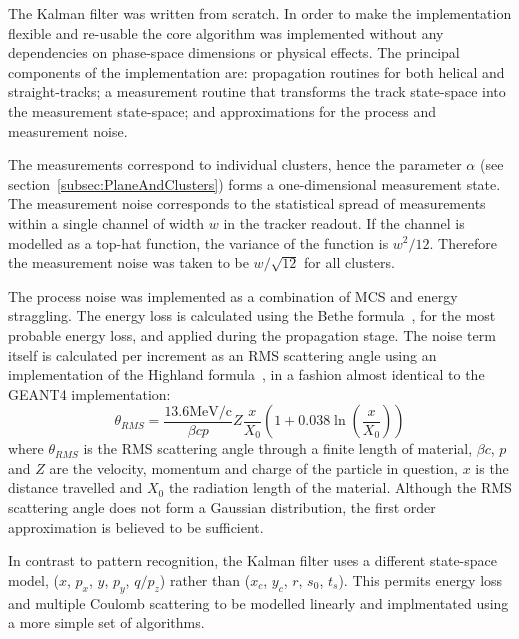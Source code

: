     The Kalman filter was written from scratch. In order to make the implementation flexible and re-usable the core algorithm was implemented without any dependencies on phase-space dimensions or physical effects. %
    The principal components of the implementation are: propagation routines for both helical and straight-tracks; a measurement routine that transforms the track state-space into the measurement state-space; and approximations for the process and measurement noise.
    
    The measurements correspond to individual clusters, hence the parameter $\alpha$ (see section~\ref{subsec:PlaneAndClusters}) forms a one-dimensional measurement state. The measurement noise corresponds to the statistical spread of measurements within a single channel of width $w$ in the tracker readout. If the channel is modelled as a top-hat function, the variance of the function is $w^2/12$. Therefore the measurement noise was taken to be $w/\sqrt{12}$ for all clusters.

    The process noise was implemented as a combination of MCS and energy straggling. The energy loss is calculated using the Bethe formula~\cite{PDG}, for the most probable energy loss, and applied during the propagation stage. The noise term itself is calculated per increment as an RMS scattering angle using an implementation of the Highland formula~\cite{Highland}, in a fashion almost identical to the GEANT4 implementation:
    \begin{equation}
      \theta_{RMS} = \frac{13.6\textrm{MeV/c}}{\beta c p} Z \frac{x}{X_0}\left( 1 + 0.038 \ln\left(\frac{x}{X_0} \right)\right)
      \label{equ:highland_formula}
    \end{equation}
    where $\theta_{RMS}$ is the RMS scattering angle through a finite length of material, $\beta c$, $p$ and $Z$ are the velocity, momentum and charge of the particle in question, $x$ is the distance travelled and $X_0$ the radiation length of the material. Although the RMS scattering angle does not form a Gaussian distribution, the first order approximation is believed to be sufficient.

    In contrast to pattern recognition, the Kalman filter uses a different state-space model, ($x$, $p_x$, $y$, $p_y$, $q/p_z$) rather than ($x_c$, $y_c$, $r$, $s_0$, $t_s$). This permits energy loss and multiple Coulomb scattering to be modelled linearly and implmentated using a more simple set of algorithms. 
    
